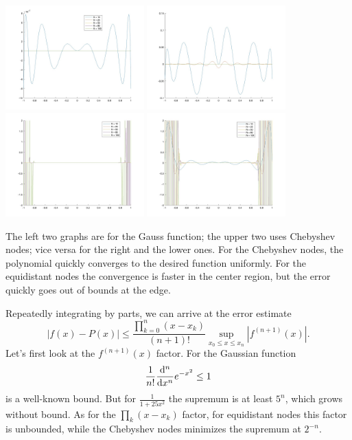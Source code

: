 \documentclass{homework}
\begin{document}
\begin{problem}
\begin{center}
\includegraphics[width=0.4\textwidth]{Hw2-Fig2-Gauss-Chebyshev.jpg}
\includegraphics[width=0.4\textwidth]{Hw2-Fig2-Hat-Chebyshev.jpg}\\
\includegraphics[width=0.4\textwidth]{Hw2-Fig2-Gauss-Equidistant.jpg}
\includegraphics[width=0.4\textwidth]{Hw2-Fig2-Hat-Equidistant.jpg}\\
\end{center}
The left two graphs are for the Gauss
function; the upper two uses Chebyshev nodes; vice versa
for the right and the lower ones. For the Chebyshev
nodes, the polynomial quickly converges to the
desired function uniformly. For the equidistant
nodes the convergence is faster in the center region,
but the error quickly goes out of bounds at the edge.

Repeatedly integrating by parts, we can arrive
at the error estimate
\[|f(x) - P(x)| \le \frac{\prod_{k=0}^n (x - x_k)}{(n+1)!}
\sup_{x_0 \le x \le x_n} |f^{(n+1)}(x)|.\]
Let's first look at the \(f^{(n+1)}(x)\) factor.
For the Gaussian function
\[\frac{1}{n!}\frac{\d[^n]}{\d[x^n]}e^{-x^2} \le 1\]
is a well-known bound. But for
\(\frac{1}{1+25x^2}\) the supremum is at least \(5^n\),
which grows without bound. As for the
\(\prod_k (x - x_k)\) factor, for equidistant
nodes this factor is unbounded, while
the Chebyshev nodes minimizes the supremum
at \(2^{-n}\).


\end{problem}
\end{document}
